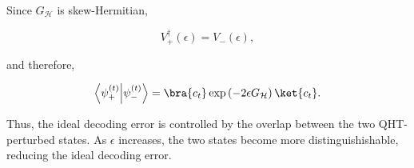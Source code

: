 \documentclass[11pt]{article}
\theoremstyle{plain}
\theoremstyle{definition}
\theoremstyle{remark}
\begin{document}
Since $G_{\mathcal H}$ is skew-Hermitian,

\begin{equation}
V_{+}^{\dagger}(\epsilon)
=
V_{-}(\epsilon),
\end{equation}

and therefore,

\begin{equation}
\left\langle
\psi_{+}^{(t)}
\middle|
\psi_{-}^{(t)}
\right\rangle
=
\bra{c_t}
\exp\left(
-2\epsilon G_{\mathcal H}
\right)
\ket{c_t}.
\end{equation}

Thus, the ideal decoding error is controlled by the overlap between the two QHT-perturbed states. As $\epsilon$ increases, the two states become more distinguishishable, reducing the ideal decoding error.
\end{document}
